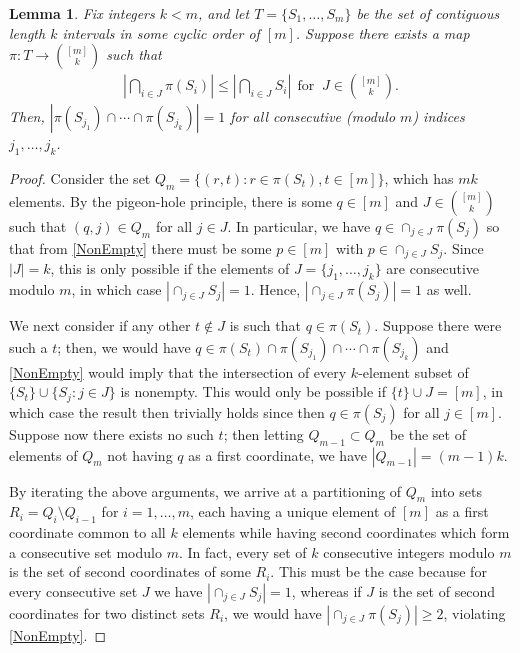 \documentclass[journal, twocolumn]{IEEEtran}
\newtheorem{lemma}{Lemma}
\begin{document}

\begin{lemma}\label{NonEmptyLemma} Fix integers $k < m$, and let $T = \{S_1, \ldots, S_m\}$ be the set of contiguous length $k$ intervals in some cyclic order of $[m]$. Suppose there exists a map $\pi: T \to {[m] \choose k}$ such that
\begin{align}\label{NonEmpty}
|\bigcap_{i \in J} \pi(S_i)| \leq |\bigcap_{i \in J} S_i | \ \ \text{for } \ J \in {[m] \choose k}.
\end{align}
%
Then, $|\pi(S_{j_1}) \cap \cdots \cap \pi(S_{j_k})| = 1$ for all consecutive (modulo $m$) indices $j_1,\ldots,j_k$.
\end{lemma}

\begin{proof} Consider the set $Q_m = \{ (r,t) : r \in \pi(S_t), t \in [m] \}$, which has $mk$ elements. By the pigeon-hole principle, there is some $q \in [m]$ and $J \in {[m] \choose k}$ such that $(q, j) \in Q_m$ for all $j \in J$. In particular, we have $q \in \cap_{j \in J} \pi(S_j)$ so that from \eqref{NonEmpty} there must be some $p \in [m]$ with $p \in \cap_{j \in J} S_j$. Since $|J| = k$, this is only possible if the elements of $J = \{j_1, \ldots, j_k\}$ are consecutive modulo $m$, in which case $|\cap_{j \in J} S_j| = 1$. Hence, $|\cap_{j \in J} \pi(S_j)| = 1$ as well.

We next consider if any other $t \notin J$ is such that $q \in \pi(S_t)$. Suppose there were such a $t$; then, we would have $q \in \pi(S_t) \cap \pi(S_{j_1}) \cap \cdots \cap \pi(S_{j_k})$ and \eqref{NonEmpty} would imply that the intersection of every $k$-element subset of $\{S_t\} \cup \{S_j: j \in J\}$ is nonempty. This would only be possible if $\{t\} \cup J = [m]$, in which case the result then trivially holds since then $q \in \pi(S_j)$ for all $j \in [m]$.  Suppose now there exists no such $t$; then letting $Q_{m-1} \subset Q_m$ be the set of elements of $Q_m$ not having $q$ as a first coordinate, we have $|Q_{m-1}| = (m-1)k$. 

By iterating the above arguments, we arrive at a partitioning of $Q_m$ into sets $R_i = Q_i \setminus Q_{i-1}$ for $i = 1, \ldots, m$, each having a unique element of $[m]$ as a first coordinate common to all $k$ elements while having second coordinates which form a consecutive set modulo $m$. In fact, every set of $k$ consecutive integers modulo $m$ is the set of second coordinates of some $R_i$. This must be the case because for every consecutive set $J$ we have $|\cap_{j \in J} S_j| = 1$, whereas if $J$ is the set of second coordinates for two distinct sets $R_i$, we would have $|\cap_{j \in J} \pi(S_j)| \geq 2$, violating \eqref{NonEmpty}. 
\end{proof}
\end{document}
